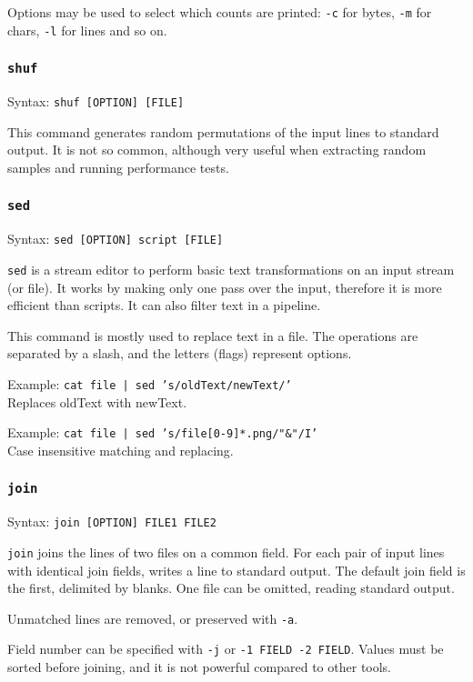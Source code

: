 Options may be used to select which counts are printed: \texttt{-c} for bytes, \texttt{-m} for chars, \texttt{-l} for lines and so on.

\subsubsection{\texttt{shuf}}
Syntax: \texttt{shuf [OPTION] [FILE]}

This command generates random permutations of the input lines to standard output. It is not so common, although very useful when extracting random samples and running performance tests.

\subsubsection{\texttt{sed}}
Syntax: \texttt{sed [OPTION] {script} [FILE]}

\texttt{sed} is a stream editor to perform basic text transformations on an input stream (or file). It works by making only one pass over the input, therefore it is more efficient than scripts. It can also filter text in a pipeline.

This command is mostly used to replace text in a file. The operations are separated by a slash, and the letters (flags) represent options.

Example: \texttt{cat file | sed 's/oldText/newText/'} \\
Replaces oldText with newText.

Example: \texttt{cat file | sed 's/file[0-9]*.png/"\&"/I'} \\
Case insensitive matching and replacing.

\subsubsection{\texttt{join}}
Syntax: \texttt{join [OPTION] FILE1 FILE2}

\texttt{join} joins the lines of two files on a common field. For each pair of input lines with identical join fields, writes a line to standard output. The default join field is the first, delimited by blanks. One file can be omitted, reading standard output.

Unmatched lines are removed, or preserved with \texttt{-a}.

Field number can be specified with \texttt{-j} or \texttt{-1 FIELD -2 FIELD}. Values must be sorted before joining, and it is not powerful compared to other tools.

